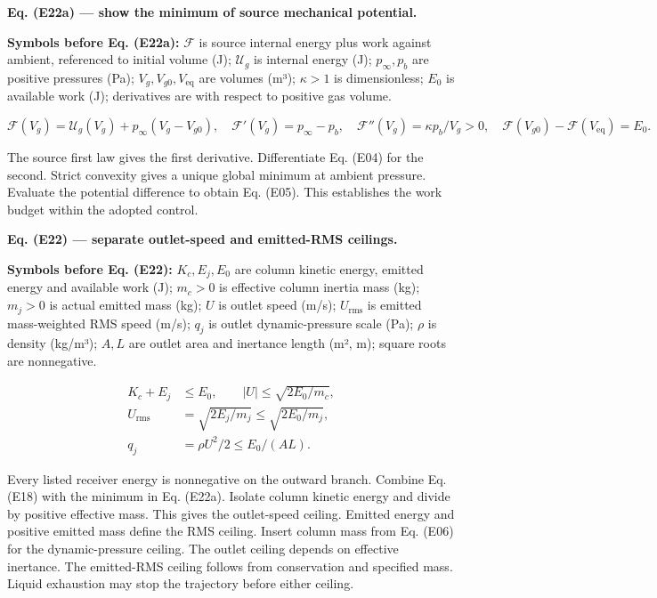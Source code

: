 \documentclass[11pt]{article}
\begin{document}
\textbf{Eq. (E22a) — show the minimum of source mechanical potential.}


\textbf{Symbols before Eq. (E22a):} \(\mathcal F\) is source internal energy plus work against ambient, referenced to initial volume (J); \(\mathcal U_g\) is internal energy (J); \(p_\infty,p_b\) are positive pressures (Pa); \(V_g,V_{g0},V_{\mathrm{eq}}\) are volumes (m³); \(\kappa>1\) is dimensionless; \(E_0\) is available work (J); derivatives are with respect to positive gas volume.



\begin{equation*}
\mathcal F(V_g)=\mathcal U_g(V_g)+p_\infty(V_g-V_{g0}),\quad
\mathcal F'(V_g)=p_\infty-p_b,\quad
\mathcal F''(V_g)=\kappa p_b/V_g>0,\quad
\mathcal F(V_{g0})-\mathcal F(V_{\mathrm{eq}})=E_0.
\end{equation*}

The source first law gives the first derivative. Differentiate Eq. (E04) for the second. Strict convexity gives a unique global minimum at ambient pressure. Evaluate the potential difference to obtain Eq. (E05). This establishes the work budget within the adopted control.


\textbf{Eq. (E22) — separate outlet-speed and emitted-RMS ceilings.}


\textbf{Symbols before Eq. (E22):} \(K_c,E_j,E_0\) are column kinetic energy, emitted energy and available work (J); \(m_c>0\) is effective column inertia mass (kg); \(m_j>0\) is actual emitted mass (kg); \(U\) is outlet speed (m/s); \(U_{\mathrm{rms}}\) is emitted mass-weighted RMS speed (m/s); \(q_j\) is outlet dynamic-pressure scale (Pa); \(\rho\) is density (kg/m³); \(A,L\) are outlet area and inertance length (m², m); square roots are nonnegative.



\begin{equation*}
\begin{aligned}
K_c+E_j&\le E_0,\qquad |U|\le\sqrt{2E_0/m_c},\\
U_{\mathrm{rms}}&=\sqrt{2E_j/m_j}\le\sqrt{2E_0/m_j},\\
q_j&=\rho U^2/2\le E_0/(AL).
\end{aligned}
\end{equation*}

Every listed receiver energy is nonnegative on the outward branch. Combine Eq. (E18) with the minimum in Eq. (E22a). Isolate column kinetic energy and divide by positive effective mass. This gives the outlet-speed ceiling. Emitted energy and positive emitted mass define the RMS ceiling. Insert column mass from Eq. (E06) for the dynamic-pressure ceiling. The outlet ceiling depends on effective inertance. The emitted-RMS ceiling follows from conservation and specified mass. Liquid exhaustion may stop the trajectory before either ceiling.
\end{document}

